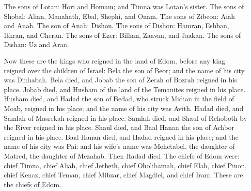 {The sons of Lotan: Hori and Homam; and Timna was Lotan’s sister.
The sons of Shobal: Alian, Manahath, Ebal, Shephi, and Onam. The sons of Zibeon: Aiah and Anah.
The son of Anah: Dishon. The sons of Dishon: Hamran, Eshban, Ithran, and Cheran.
The sons of Ezer: Bilhan, Zaavan, and Jaakan. The sons of Dishan: Uz and Aran.
\par }{\PP {}Now these are the kings who reigned in the land of Edom, before any king reigned over the children of Israel: Bela the son of Beor; and the name of his city was Dinhabah.
Bela died, and Jobab the son of Zerah of Bozrah reigned in his place.
Jobab died, and Husham of the land of the Temanites reigned in his place.
Husham died, and Hadad the son of Bedad, who struck Midian in the field of Moab, reigned in his place; and the name of his city was Avith.
Hadad died, and Samlah of Masrekah reigned in his place.
Samlah died, and Shaul of Rehoboth by the River reigned in his place.
Shaul died, and Baal Hanan the son of Achbor reigned in his place.
Baal Hanan died, and Hadad reigned in his place; and the name of his city was Pai: and his wife’s name was Mehetabel, the daughter of Matred, the daughter of Mezahab.
Then Hadad died. The chiefs of Edom were: chief Timna, chief Aliah, chief Jetheth,
chief Oholibamah, chief Elah, chief Pinon,
chief Kenaz, chief Teman, chief Mibzar,
chief Magdiel, and chief Iram. These are the chiefs of Edom.

}
